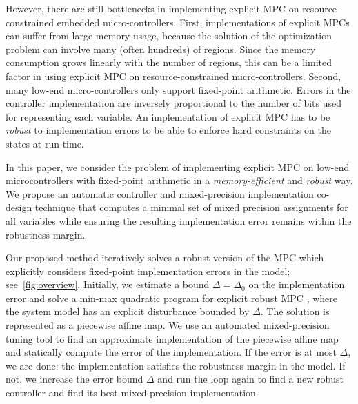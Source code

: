 However, there are still bottlenecks in implementing explicit MPC on resource-constrained embedded micro-controllers.
First, implementations of explicit MPCs can suffer from large memory usage, because the solution of the optimization
problem can involve many (often hundreds) of regions.
Since the memory consumption grows linearly with the number of regions, 
this can be a limited factor in using explicit MPC on resource-constrained micro-controllers.
Second, many low-end micro-controllers only support fixed-point arithmetic.
Errors in the controller implementation are inversely proportional to the number of bits used for representing each variable. 
An implementation of explicit MPC has to be \emph{robust} to 
implementation errors to be able to enforce hard constraints on the states at run time.

In this paper, we consider the problem of implementing explicit MPC on low-end microcontrollers with fixed-point arithmetic
in a \emph{memory-efficient} and \emph{robust} way.
We propose an automatic controller and mixed-precision implementation co-design technique that computes a minimal set  of mixed
precision assignments for all variables while ensuring the resulting implementation error remains within the robustness margin.  


Our proposed method iteratively solves a robust version of the MPC which explicitly considers fixed-point implementation errors
in the model; see~\autoref{fig:overview}.
Initially, we estimate a bound $\Delta = \Delta_0$ on the implementation error and solve a
min-max quadratic program for explicit robust MPC \cite{delaPea:2005}, where the system
model has an explicit disturbance bounded by $\Delta$.
The solution is represented as a piecewise affine map.
We use an automated mixed-precision tuning tool to find an approximate implementation of the piecewise affine
map and statically compute the error of the implementation.
If the error is at most $\Delta$, we are done: the implementation satisfies the robustness margin in the model.
If not, we increase the error bound $\Delta$ and run the loop again to find a new robust controller and find its best mixed-precision
implementation.

